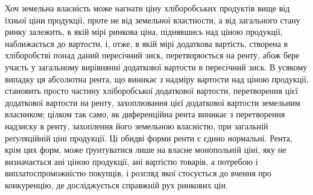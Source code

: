 Хоч земельна власність може нагнати ціну хліборобських продуктів вище
від їхньої ціни продукції, проте не від земельної властности, а від загального стану
ринку залежить, в якій мірі ринкова ціна, піднявшись над ціною продукції, наближається
до вартости, і, отже, в якій мірі додаткова вартість, створена в хліборобстві
понад даний пересічний зиск, перетворюється на ренту, абож бере участь у загальному
вирівнянні додаткової вартости в пересічний зиск. В усякому випадку
ця абсолютна рента, що виникає з надміру вартости над ціною продукції, становить
просто частину хліборобської додаткової вартости, перетворення цієї додаткової
вартости на ренту, захоплювання цієї додаткової вартости земельним власником;
цілком так само, як диференційна рента виникає з перетворення надзиску в ренту, захоплення його
земельною власністю, при загальній реґуляційній ціні продукції. Ці обидві форми ренти є єдино
нормальні. Рента, крім цих форм, може ґрунтуватися лише на власне монопольній ціні, яку не
визначається ані ціною продукції, ані вартістю товарів, а потребою і виплатоспроможністю покупців, і
розгляд якої стосується до вчення про конкуренцію, де досліджується справжній рух ринкових цін.
